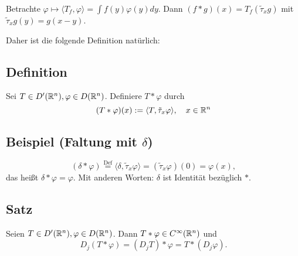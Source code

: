 Betrachte $\varphi \mapsto \langle T_f, \varphi \rangle = \int f(y) \varphi(y) dy$.
Dann $(f \ast g)(x) = T_f(\tilde \tau_x g)$ mit $\tilde\tau_x g(y) = g(x - y)$.

Daher ist die folgende Definition natürlich:

\subsection{Definition}
Sei $T \in D'(\mathbb{R}^n), \varphi \in D(\mathbb{R}^n)$.
Definiere $T \ast \varphi$ durch
$$
(T \ast \varphi)(x) := \langle T, \tilde \tau_x \varphi \rangle, \quad x \in \mathbb{R}^n
$$

\subsection{Beispiel (Faltung mit $\delta$)}

$$
(\delta \ast \varphi)
\overset{\text{Def}}{=} \langle \delta, \tilde\tau_x \varphi \rangle
= (\tilde\tau_x \varphi)(0)
= \varphi(x),
$$
das heißt $\delta \ast \varphi = \varphi$.
Mit anderen Worten: $\delta$ ist Identität bezüglich $\ast$.

\subsection{Satz}

Seien $T \in D'(\mathbb{R}^n), \varphi \in D(\mathbb{R}^n)$.
Dann $T \ast \varphi \in C^\infty(\mathbb{R}^n)$ und 
$$
D_j(T \ast \varphi) = (D_j T) \ast \varphi = T \ast (D_j \varphi).
$$

